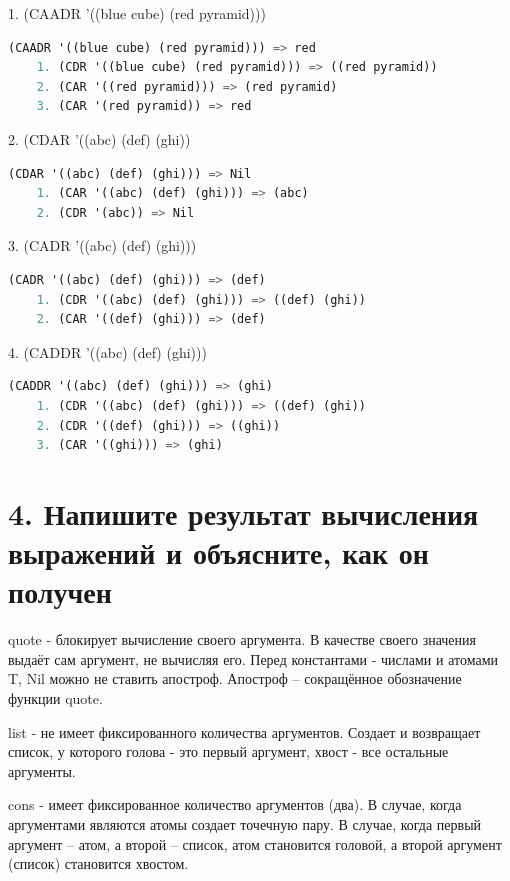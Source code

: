 \documentclass[12pt]{report}
\begin{document}
1. (CAADR '((blue cube) (red pyramid)))

\begin{lstlisting}[language=Lisp]
	(CAADR '((blue cube) (red pyramid))) => red
	1. (CDR '((blue cube) (red pyramid))) => ((red pyramid))
	2. (CAR '((red pyramid))) => (red pyramid)
	3. (CAR '(red pyramid)) => red
\end{lstlisting}

2. (CDAR '((abc) (def) (ghi))

\begin{lstlisting}[language=Lisp]
	(CDAR '((abc) (def) (ghi))) => Nil
	1. (CAR '((abc) (def) (ghi))) => (abc)
	2. (CDR '(abc)) => Nil
\end{lstlisting}

3. (CADR '((abc) (def) (ghi)))

\begin{lstlisting}[language=Lisp]
	(CADR '((abc) (def) (ghi))) => (def)
	1. (CDR '((abc) (def) (ghi))) => ((def) (ghi))
	2. (CAR '((def) (ghi))) => (def)
\end{lstlisting}


4. (CADDR '((abc) (def) (ghi)))

\begin{lstlisting}[language=Lisp]
	(CADDR '((abc) (def) (ghi))) => (ghi)
	1. (CDR '((abc) (def) (ghi))) => ((def) (ghi))
	2. (CDR '((def) (ghi))) => ((ghi))
	3. (CAR '((ghi))) => (ghi)
\end{lstlisting}


\section*{4. Напишите результат вычисления выражений и объясните, как он получен}

quote - блокирует вычисление своего аргумента. В качестве своего значения выдаёт сам аргумент, не вычисляя его. Перед константами - числами и атомами T, Nil можно не ставить апостроф. Апостроф – сокращённое обозначение функции quote.

list - не имеет фиксированного количества аргументов. Создает и возвращает список, у которого голова - это первый аргумент, хвост - все остальные аргументы.


cons - имеет фиксированное количество аргументов (два). В случае, когда аргументами являются атомы создает точечную пару. В случае, когда первый аргумент -- атом, а второй -- список, атом становится головой, а второй аргумент (список) становится хвостом.
\end{document}
